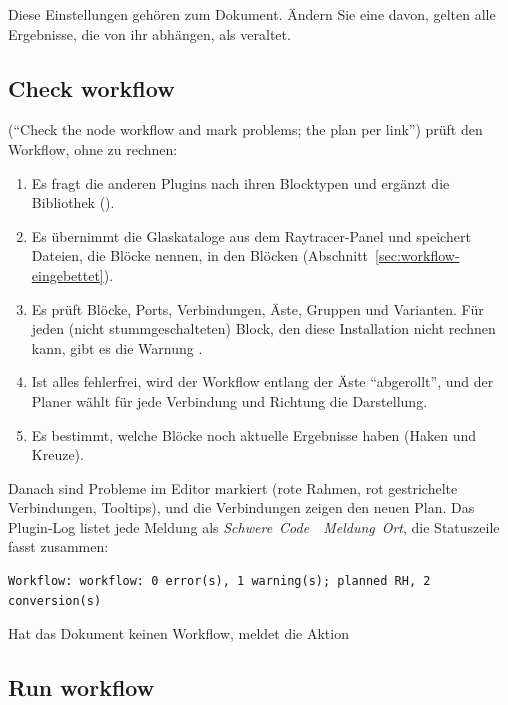 Diese Einstellungen gehören zum Dokument. Ändern Sie eine davon, gelten alle Ergebnisse, die von
ihr abhängen, als veraltet.

\subsection{Check workflow}\label{sec:workflow-pruefen}

 (\enquote{Check the node workflow and mark problems; the plan per link})
prüft den Workflow, ohne zu rechnen:

\begin{enumerate}
  \item Es fragt die anderen Plugins nach ihren Blocktypen und ergänzt die Bibliothek
        ().
  \item Es übernimmt die Glaskataloge aus dem Raytracer-Panel und speichert Dateien, die Blöcke
        nennen, in den Blöcken (Abschnitt~\ref{sec:workflow-eingebettet}).
  \item Es prüft Blöcke, Ports, Verbindungen, Äste, Gruppen und Varianten. Für jeden (nicht
        stummgeschalteten) Block, den diese Installation nicht rechnen kann, gibt es die
        Warnung .
  \item Ist alles fehlerfrei, wird der Workflow entlang der Äste \enquote{abgerollt}, und der
        Planer wählt für jede Verbindung und Richtung die Darstellung.
  \item Es bestimmt, welche Blöcke noch aktuelle Ergebnisse haben (Haken und Kreuze).
\end{enumerate}

Danach sind Probleme im Editor markiert (rote Rahmen, rot gestrichelte Verbindungen, Tooltips),
und die Verbindungen zeigen den neuen Plan. Das Plugin-Log listet jede Meldung als
\textit{Schwere}\code{:}~\textit{Code}~~\textit{Meldung}~\code{(}\textit{Ort}\code{)},
die Statuszeile fasst zusammen:

\begin{lstlisting}
Workflow: workflow: 0 error(s), 1 warning(s); planned RH, 2 conversion(s)
\end{lstlisting}

Hat das Dokument keinen Workflow, meldet die Aktion 

\subsection{Run workflow}\label{sec:workflow-ausfuehren}

